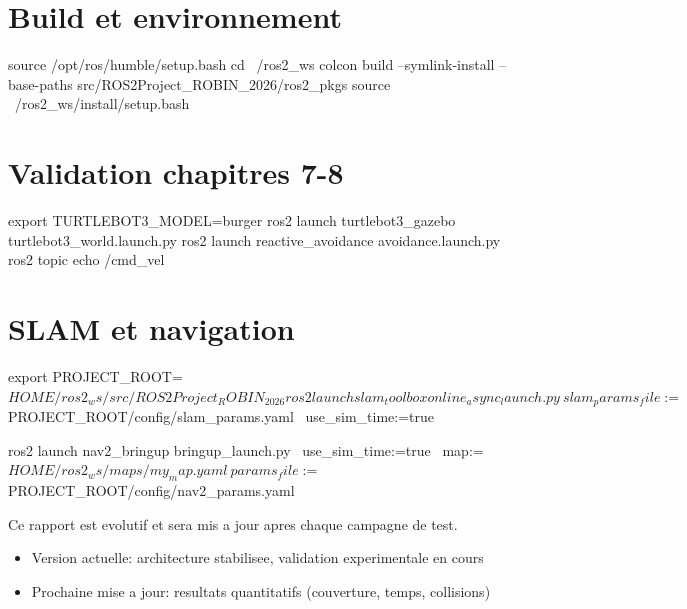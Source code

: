\documentclass[11pt,a4paper,french]{imta}
\begin{document}
\newpage
\begin{IMTAannexes}


\section{Build et environnement}
\begin{bash}
source /opt/ros/humble/setup.bash
cd ~/ros2_ws
colcon build --symlink-install --base-paths src/ROS2Project_ROBIN_2026/ros2_pkgs
source ~/ros2_ws/install/setup.bash
\end{bash}

\section{Validation chapitres 7-8}
\begin{bash}
export TURTLEBOT3_MODEL=burger
ros2 launch turtlebot3_gazebo turtlebot3_world.launch.py
ros2 launch reactive_avoidance avoidance.launch.py
ros2 topic echo /cmd_vel
\end{bash}

\section{SLAM et navigation}
\begin{bash}
export PROJECT_ROOT=$HOME/ros2_ws/src/ROS2Project_ROBIN_2026
ros2 launch slam_toolbox online_async_launch.py \
  slam_params_file:=$PROJECT_ROOT/config/slam_params.yaml \
  use_sim_time:=true

ros2 launch nav2_bringup bringup_launch.py \
  use_sim_time:=true \
  map:=$HOME/ros2_ws/maps/my_map.yaml \
  params_file:=$PROJECT_ROOT/config/nav2_params.yaml
\end{bash}

Ce rapport est evolutif et sera mis a jour apres chaque campagne de test.

\begin{itemize}
  \item Version actuelle: architecture stabilisee, validation experimentale en cours
  \item Prochaine mise a jour: resultats quantitatifs (couverture, temps, collisions)
\end{itemize}

\end{IMTAannexes}
\end{document}
